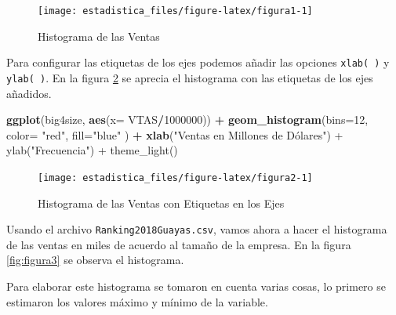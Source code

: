 \documentclass[]{book}
\newenvironment{Shaded}{\begin{snugshade}}{\end{snugshade}}
\newcommand{\CommentTok}[1]{\textcolor[rgb]{0.56,0.35,0.01}{\textit{#1}}}
\newcommand{\DataTypeTok}[1]{\textcolor[rgb]{0.13,0.29,0.53}{#1}}
\newcommand{\DecValTok}[1]{\textcolor[rgb]{0.00,0.00,0.81}{#1}}
\newcommand{\KeywordTok}[1]{\textcolor[rgb]{0.13,0.29,0.53}{\textbf{#1}}}
\newcommand{\NormalTok}[1]{#1}
\newcommand{\OperatorTok}[1]{\textcolor[rgb]{0.81,0.36,0.00}{\textbf{#1}}}
\newcommand{\StringTok}[1]{\textcolor[rgb]{0.31,0.60,0.02}{#1}}
\begin{document}
\begin{figure}[h!]

{\centering \texttt{[image: estadistica\_files/figure-latex/figura1-1]} 

}

\caption{Histograma de las Ventas}\label{fig:figura1}
\end{figure}

Para configurar las etiquetas de los ejes podemos añadir las opciones \texttt{xlab(\ )} y \texttt{ylab(\ )}. En la figura \ref{fig:figura2} se aprecia el histograma con las etiquetas de los ejes añadidos.

\begin{Shaded}
\begin{Highlighting}[]
\KeywordTok{ggplot}\NormalTok{(big4size, }\KeywordTok{aes}\NormalTok{(}\DataTypeTok{x=}\NormalTok{ VTAS}\OperatorTok{/}\DecValTok{1000000}\NormalTok{)) }\OperatorTok{+}\StringTok{ }
\StringTok{  }\KeywordTok{geom_histogram}\NormalTok{(}\DataTypeTok{bins=}\DecValTok{12}\NormalTok{, }\DataTypeTok{color=} \StringTok{"red"}\NormalTok{,  }\DataTypeTok{fill=}\StringTok{"blue"}\NormalTok{ ) }\OperatorTok{+}\StringTok{ }
\StringTok{  }\KeywordTok{xlab}\NormalTok{(}\StringTok{"Ventas en Millones de Dólares") + ylab("}\NormalTok{Frecuencia}\StringTok{") +}
\StringTok{  theme_light()}
\end{Highlighting}
\end{Shaded}

\begin{figure}[h!]

{\centering \texttt{[image: estadistica\_files/figure-latex/figura2-1]} 

}

\caption{Histograma de las Ventas con Etiquetas en los Ejes}\label{fig:figura2}
\end{figure}

Usando el archivo \texttt{Ranking2018Guayas.csv}, vamos ahora a hacer el histograma de las ventas en miles de acuerdo al tamaño de la empresa. En la figura \ref{fig:figura3} se observa el histograma.

Para elaborar este histograma se tomaron en cuenta varias cosas, lo primero se estimaron los valores máximo y mínimo de la variable.

\begin{Shaded}
\end{Shaded}
\end{document}
